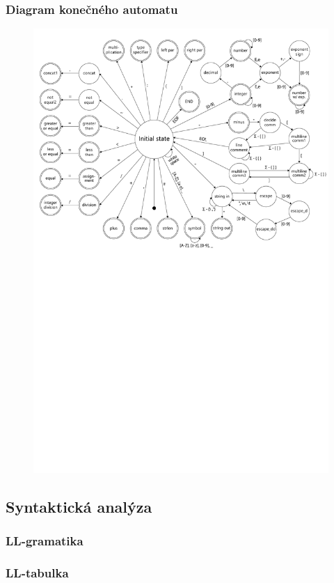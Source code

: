 \documentclass[11pt,a4paper]{article}
\begin{document}
        \subsubsection{Diagram konečného automatu}
        \begin{figure}
            \centering
            \includegraphics[scale=0.37]{images/FSM_v4.pdf}
        \end{figure}
    \subsection{Syntaktická analýza}
        \subsubsection{LL-gramatika}
        \subsubsection{LL-tabulka}
\end{document}
